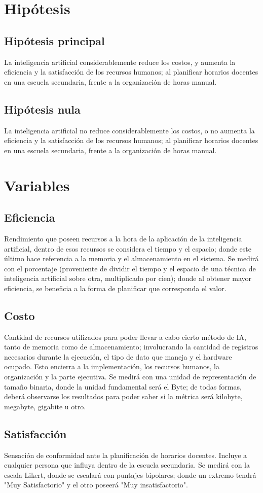 \section{Hipótesis}
\subsection*{Hipótesis principal}
\normalsize{ \indent
La inteligencia artificial considerablemente reduce
los costos, y aumenta la eficiencia y la satisfacción de
los recursos humanos; al planificar horarios docentes en
una escuela secundaria, frente a la organización de
horas manual.
}
\subsection*{Hipótesis nula}
\normalsize{ \indent
La inteligencia artificial no reduce considerablemente
los costos, o no aumenta la eficiencia y la satisfacción de
los recursos humanos; al planificar horarios docentes en
una escuela secundaria, frente a la organización de horas
manual.
}
\section{Variables}
\subsection*{Eficiencia}
\normalsize{ \indent
Rendimiento que poseen recursos a la hora de la aplicación
de la inteligencia artificial, dentro de esos recursos se
considera el tiempo y el espacio; donde este último hace
referencia a la memoria y el almacenamiento en el sistema.
Se medirá con el porcentaje (proveniente de dividir el
tiempo y el espacio de una técnica de inteligencia artificial
sobre otra, multiplicado por cien); donde al obtener mayor
eficiencia, se beneficia a la forma de planificar que
corresponda el valor.
}
\subsection*{Costo}
\normalsize{ \indent
Cantidad de recursos utilizados para poder llevar a cabo
cierto método de IA, tanto de memoria como de
almacenamiento; involucrando la cantidad de registros
necesarios durante la ejecución, el tipo de dato que
maneja y el hardware ocupado. Esto encierra a la
implementación, los recursos humanos, la organización y
la parte ejecutiva. Se medirá con una unidad de
representación de tamaño binaria, donde la unidad
fundamental será el Byte; de todas formas, deberá
observarse los resultados para poder saber si la métrica
será kilobyte, megabyte, gigabite u otro.
}
\subsection*{Satisfacción}
\normalsize{ \indent
Sensación de conformidad ante la planificación de horarios
docentes. Incluye a cualquier persona que influya dentro
de la escuela secundaria. Se medirá con la escala Likert,
donde se escalará con puntajes bipolares; donde un extremo
tendrá "Muy Satisfactorio" y el otro poseerá "Muy
insatisfactorio".
}
